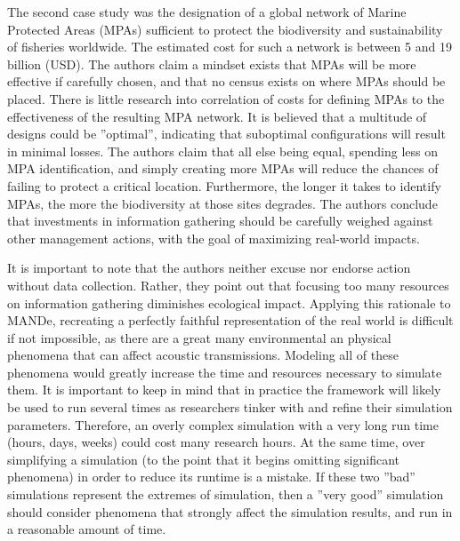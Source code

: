 The second case study was the designation of a global network of Marine Protected Areas (MPAs) sufficient to protect the biodiversity and sustainability of fisheries worldwide.  The estimated cost for such a network is between 5 and 19 billion (USD).  The authors claim a mindset exists that MPAs will be more effective if carefully chosen, and that no census exists on where MPAs should be placed. There is little research into correlation of costs for defining MPAs to the effectiveness of the resulting MPA network.  It is believed that a multitude of designs could be ''optimal'', indicating that suboptimal configurations will result in minimal losses.  The authors claim that all else being equal, spending less on MPA identification, and simply creating more MPAs will reduce the chances of failing to protect a critical location.  Furthermore, the longer it takes to identify MPAs, the more the biodiversity at those sites degrades.  The authors conclude that investments in information gathering should be carefully weighed against other management actions, with the goal of maximizing real-world impacts.

It is important to note that the authors neither excuse nor endorse action without data collection.  Rather, they point out that focusing too many resources on information gathering diminishes ecological impact.  Applying this rationale to MANDe, recreating a perfectly faithful representation of the real world is difficult if not impossible, as there are a great many environmental an physical phenomena that can affect acoustic transmissions.  Modeling all of these phenomena would greatly increase the time and resources necessary to simulate them.  It is important to keep in mind that in practice the framework will likely be used to run several times as researchers tinker with and refine their simulation parameters.  Therefore, an overly complex simulation with a very long run time (hours, days, weeks) could cost many research hours. At the same time, over simplifying a simulation (to the point that it begins omitting significant phenomena) in order to reduce its runtime is a mistake.  If these two ''bad'' simulations represent the extremes of simulation, then a ''very good'' simulation should consider phenomena that strongly affect the simulation results, and run in a reasonable amount of time.  



